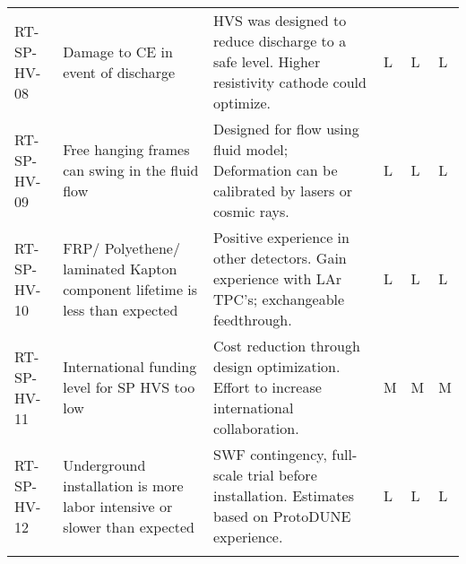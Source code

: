 \begin{footnotesize}
\begin{longtable}{P{0.18\textwidth}P{0.20\textwidth}P{0.32\textwidth}P{0.02\textwidth}P{0.02\textwidth}P{0.02\textwidth}}
RT-SP-HV-08 & Damage to CE in event of discharge  & HVS was designed to reduce discharge to a safe level. Higher resistivity cathode could optimize. & L & L & L \\  \colhline
RT-SP-HV-09 & Free hanging frames can swing in the fluid flow  & Designed for flow using fluid model; Deformation can be calibrated by lasers or cosmic rays. & L & L & L \\  \colhline
RT-SP-HV-10 & FRP/ Polyethene/ laminated Kapton component lifetime is less than expected & Positive experience in other detectors. Gain experience with LAr TPC's; exchangeable feedthrough. & L & L & L \\  \colhline
RT-SP-HV-11 & International funding level for SP HVS too low & Cost reduction through design optimization. Effort to increase international collaboration. & M & M & M \\  \colhline
RT-SP-HV-12 & Underground installation is more labor intensive or slower than expected & SWF contingency, full-scale trial before installation. Estimates based on ProtoDUNE experience. & L & L & L \\  \colhline

\label{tab:risks:SP-FD-HV}
\end{longtable}
\end{footnotesize}
